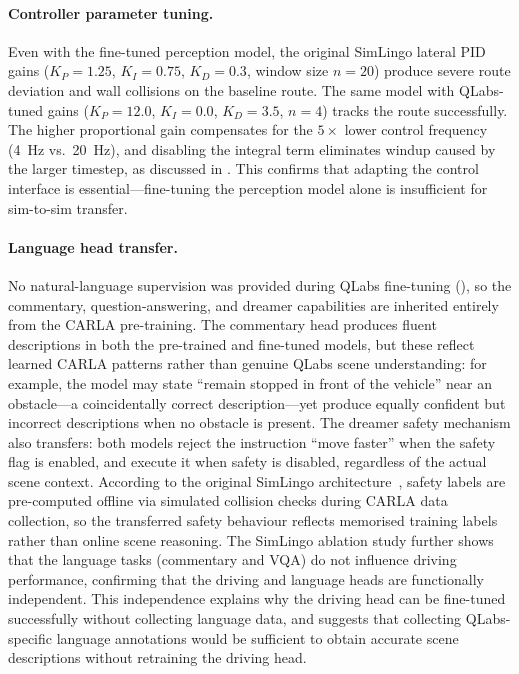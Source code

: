 \paragraph{Controller parameter tuning.}
Even with the fine-tuned perception model, the original SimLingo lateral PID gains ($K_P{=}1.25$, $K_I{=}0.75$, $K_D{=}0.3$, window size $n{=}20$) produce severe route deviation and wall collisions on the baseline route. The same model with QLabs-tuned gains ($K_P{=}12.0$, $K_I{=}0.0$, $K_D{=}3.5$, $n{=}4$) tracks the route successfully. The higher proportional gain compensates for the $5{\times}$ lower control frequency (\SI{4}{Hz} vs.\ \SI{20}{Hz}), and disabling the integral term eliminates windup caused by the larger timestep, as discussed in . This confirms that adapting the control interface is essential---fine-tuning the perception model alone is insufficient for sim-to-sim transfer.

\paragraph{Language head transfer.}
No natural-language supervision was provided during QLabs fine-tuning (), so the commentary, question-answering, and dreamer capabilities are inherited entirely from the CARLA pre-training. The commentary head produces fluent descriptions in both the pre-trained and fine-tuned models, but these reflect learned CARLA patterns rather than genuine QLabs scene understanding: for example, the model may state ``remain stopped in front of the vehicle'' near an obstacle---a coincidentally correct description---yet produce equally confident but incorrect descriptions when no obstacle is present. The dreamer safety mechanism also transfers: both models reject the instruction ``move faster'' when the safety flag is enabled, and execute it when safety is disabled, regardless of the actual scene context. According to the original SimLingo architecture~\citep{simlingo2023}, safety labels are pre-computed offline via simulated collision checks during CARLA data collection, so the transferred safety behaviour reflects memorised training labels rather than online scene reasoning. The SimLingo ablation study further shows that the language tasks (commentary and VQA) do not influence driving performance, confirming that the driving and language heads are functionally independent. This independence explains why the driving head can be fine-tuned successfully without collecting language data, and suggests that collecting QLabs-specific language annotations would be sufficient to obtain accurate scene descriptions without retraining the driving head.

